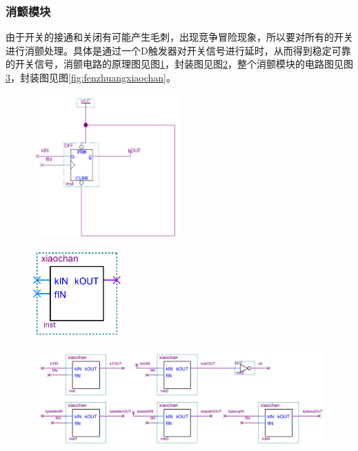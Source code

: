 \documentclass[12pt]{article}
\begin{document}
\subsubsection{消颤模块}
由于开关的接通和关闭有可能产生毛刺，出现竞争冒险现象，所以要对所有的开关进行消颤处理。具体是通过一个D触发器对开关信号进行延时，从而得到稳定可靠的开关信号，消颤电路的原理图见图\ref{fig:xiaochan}，封装图见图\ref{fig:fenzhuangxiaochan1}，整个消颤模块的电路图见图\ref{fig:xiaochanjihe}，封装图见图\ref{fig:fenzhuangxiaochan}。
\begin{figure}[hp]
	\centering  
	\includegraphics[width=0.5\textwidth]{picture/xiaochan.png} 
	\caption{}
	\label{fig:xiaochan}   
\end{figure}
\begin{figure}[hp]
	\centering  
	\includegraphics[width=0.3\textwidth]{picture/fenzhuangxiaochan1.png} 
	\caption{}
	\label{fig:fenzhuangxiaochan1}   
\end{figure}\par
\begin{figure}[hp]
	\centering  
	\includegraphics[width=\textwidth]{picture/xiaochanjihe.png} 
	\caption{}
	\label{fig:xiaochanjihe}   
\end{figure}
\end{document}
